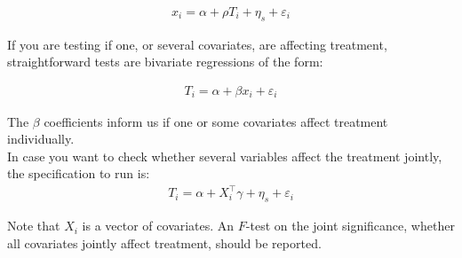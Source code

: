 \documentclass[11pt, oneside]{article}   	%
\begin{document}
\begin{align*}
x_i =  \alpha + \rho T_i + \eta_s + \varepsilon_i
\end{align*}
 
 
 If you are testing if one, or several covariates, are affecting treatment, straightforward tests are bivariate regressions of the form:
 
 \begin{align*}
T_i = \alpha + \beta x_i+ \varepsilon_i
\end{align*}
 
The $\beta$ coefficients inform us if one or some covariates affect treatment individually.\\


In case you want to check whether several variables affect the treatment  jointly, the specification to run is:
 \begin{align*}
 T_i = \alpha + X_i ^\intercal \gamma+ \eta_s + \varepsilon_i
\end{align*}
 
Note that $X_i$ is a vector of covariates. An $F$-test on the joint significance, whether all covariates jointly affect treatment, should be reported.
\end{document}
